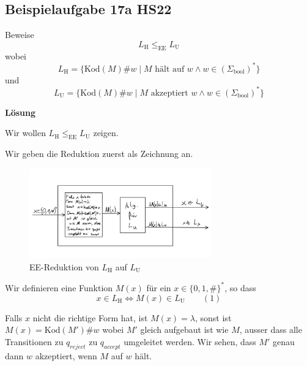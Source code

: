 \documentclass[a4paper, 11pt]{article}
\begin{document}
                    \subsection{Beispielaufgabe 17a HS22}

                    Beweise $$L_{\text{H}} \leq_{\text{EE}} L_{\text{U}}$$
                    wobei 
                    $$L_{\text{H}} = \{\text{Kod}(M)\#w \mid M\text{ hält auf }w\land w \in (\Sigma_{\text{bool}})^*\}$$
                    und 
                    $$L_{\text{U}}=\{\text{Kod}(M)\#w \mid M \text{ akzeptiert }w \land w \in (\Sigma_{\text{bool}})^*\}$$
                
                
                    \textbf{Lösung}
                
                    Wir wollen $L_{\text{H}} \leq_{\text{EE}} L_{\text{U}}$ zeigen.
                
                        Wir geben die Reduktion zuerst als Zeichnung an.
                
                        \begin{figure}[htp]
                            \centering
                            \includegraphics[width = 0.7\textwidth]{Images/17a_Zeichnung.png}
                            \caption{EE-Reduktion von $L_{\text{H}}$ auf $L_{\text{U}}$}
                        \end{figure}
                        
            
                    Wir definieren eine Funktion $M(x)$ für ein $x \in \{0,1,\#\}^*$, so dass
                        $$x \in L_{\text{H}} \iff M(x) \in L_{\text{U}} \qquad (1)$$
                    
                        Falls $x$ nicht die richtige Form hat, ist $M(x) = \lambda$, sonst ist $M(x) = \text{Kod}(M')\#w$ wobei $M'$ gleich aufgebaut ist wie $M$, ausser dass alle Transitionen zu $q_{reject}$ zu $q_{accept}$ umgeleitet werden. Wir sehen, dass $M'$ genau dann $w$ akzeptiert, wenn $M$ auf $w$ hält. 
                        
\end{document}
